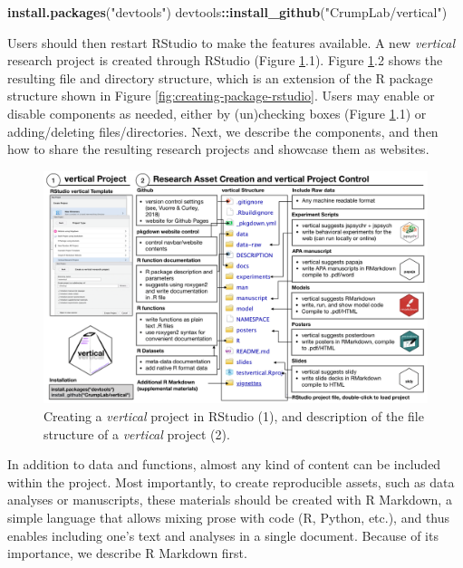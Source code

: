 \documentclass[
  english,
  jou,floatsintext]{apa6}
\newenvironment{Shaded}{\begin{snugshade}}{\end{snugshade}}
\newcommand{\KeywordTok}[1]{\textcolor[rgb]{0.13,0.29,0.53}{\textbf{#1}}}
\newcommand{\NormalTok}[1]{#1}
\newcommand{\OperatorTok}[1]{\textcolor[rgb]{0.81,0.36,0.00}{\textbf{#1}}}
\newcommand{\StringTok}[1]{\textcolor[rgb]{0.31,0.60,0.02}{#1}}
\begin{document}
\begin{Shaded}
\begin{Highlighting}[]
\KeywordTok{install.packages}\NormalTok{(}\StringTok{"devtools"}\NormalTok{)}
\NormalTok{devtools}\OperatorTok{::}\KeywordTok{install\_github}\NormalTok{(}\StringTok{"CrumpLab/vertical"}\NormalTok{)}
\end{Highlighting}
\end{Shaded}

Users should then restart RStudio to make the features available. A new \emph{vertical} research project is created through RStudio (Figure \ref{fig:vertical-project-structure}.1). Figure \ref{fig:vertical-project-structure}.2 shows the resulting file and directory structure, which is an extension of the R package structure shown in Figure \ref{fig:creating-package-rstudio}. Users may enable or disable components as needed, either by (un)checking boxes (Figure \ref{fig:vertical-project-structure}.1) or adding/deleting files/directories. Next, we describe the components, and then how to share the resulting research projects and showcase them as websites.

\begin{figure}

{\centering \includegraphics[width=\textwidth]{images/vertical-project} 

}

\caption{Creating a \emph{vertical} project in RStudio (1), and description of the file structure of a \emph{vertical} project (2).}\label{fig:vertical-project-structure}
\end{figure}

In addition to data and functions, almost any kind of content can be included within the project. Most importantly, to create reproducible assets, such as data analyses or manuscripts, these materials should be created with R Markdown, a simple language that allows mixing prose with code (R, Python, etc.), and thus enables including one's text and analyses in a single document. Because of its importance, we describe R Markdown first.
\end{document}
